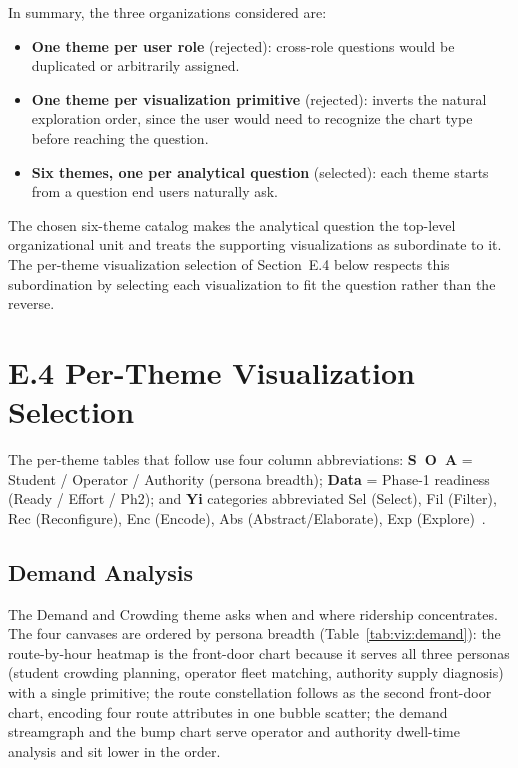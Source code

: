 In summary, the three organizations considered are:
\begin{itemize}
\item \textbf{One theme per user role} (rejected): cross-role questions would be duplicated or arbitrarily assigned.
\item \textbf{One theme per visualization primitive} (rejected): inverts the natural exploration order, since the user would need to recognize the chart type before reaching the question.
\item \textbf{Six themes, one per analytical question} (selected): each theme starts from a question end users naturally ask.
\end{itemize}

The chosen six-theme catalog makes the analytical question the
top-level organizational unit and treats the supporting visualizations as
subordinate to it. The per-theme visualization selection of
Section~E.4 below respects this subordination by selecting each
visualization to fit the question rather than the reverse.

\section*{E.4 Per-Theme Visualization Selection}
\label{sec:solution:viz:pertheme}

The per-theme tables that follow use four column abbreviations: \textbf{S~O~A} = Student / Operator / Authority (persona breadth); \textbf{Data} = Phase-1 readiness (Ready / Effort / Ph2); and \textbf{Yi} categories abbreviated Sel (Select), Fil (Filter), Rec (Reconfigure), Enc (Encode), Abs (Abstract/Elaborate), Exp (Explore)~\cite{yi2007interaction}.

\subsection*{Demand Analysis}
\label{sec:solution:viz:demand}

The Demand and Crowding theme asks when and where ridership
concentrates. The four canvases are ordered by persona breadth
(Table~\ref{tab:viz:demand}): the route-by-hour heatmap is the
front-door chart because it serves all three personas (student
crowding planning, operator fleet matching, authority supply
diagnosis) with a single primitive; the route constellation follows
as the second front-door chart, encoding four route attributes in one
bubble scatter; the demand streamgraph and the bump chart serve
operator and authority dwell-time analysis and sit lower in the
order.

